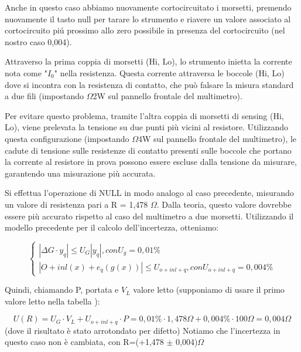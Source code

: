 Anche in questo caso abbiamo nuovamente cortocircuitato i morsetti, premendo nuovamente il tasto null per tarare lo strumento e riavere un valore associato al cortocircuito pi\'u prossimo allo zero possibile in presenza del cortocircuito (nel nostro caso 0,004).


Attraverso la prima coppia di morsetti (Hi, Lo), lo strumento inietta la corrente nota come "$I_0$" nella resistenza. Questa corrente attraversa le boccole (Hi, Lo) dove si incontra con la resistenza di contatto, che può falsare la misura standard a due fili (impostando $\Omega$2W sul pannello frontale del multimetro).

Per evitare questo problema, tramite l'altra coppia di morsetti di sensing (Hi, Lo), viene prelevata la tensione su due punti più vicini al resistore. Utilizzando questa configurazione (impostando $\Omega$4W sul pannello frontale del multimetro), le cadute di tensione sulle resistenze di contatto presenti sulle boccole che portano la corrente al resistore in prova possono essere escluse dalla tensione da misurare, garantendo una misurazione più accurata.

Si effettua l'operazione di NULL in modo analogo al caso precedente, misurando un valore di resistenza pari a R = 1,478 $\Omega$. Dalla teoria, questo valore dovrebbe essere più accurato rispetto al caso del multimetro a due morsetti. Utilizzando il modello precedente per il calcolo dell'incertezza, otteniamo:

\begin{equation}
    \left\{\begin{array}{l}
| \Delta G \cdot y_q | \leq U_G |y_q|,    con U_g=0,01\%
\\ | O + inl(x) + e_q(g(x)) | \leq U_{o+inl+q}, con U_{o+inl+q}=0,004\%
\end{array}\right.
\end{equation}


    


Quindi, chiamando P, portata e $V_L$ valore letto (supponiamo di usare il primo valore letto nella tabella \label{mult_port}):

\begin{equation*}
    U(R) = U_G \cdot V_L + U_{o+inl+q} \cdot P = 0,01\% \cdot 1,478\Omega + 0,004 \% \cdot 100 \Omega = 0,004 \Omega 
\end{equation*}
(dove il risultato è stato arrotondato per difetto)
Notiamo che l’incertezza in questo caso non è cambiata, con R=(+1,478 $\pm$ 0,004)$\Omega$



